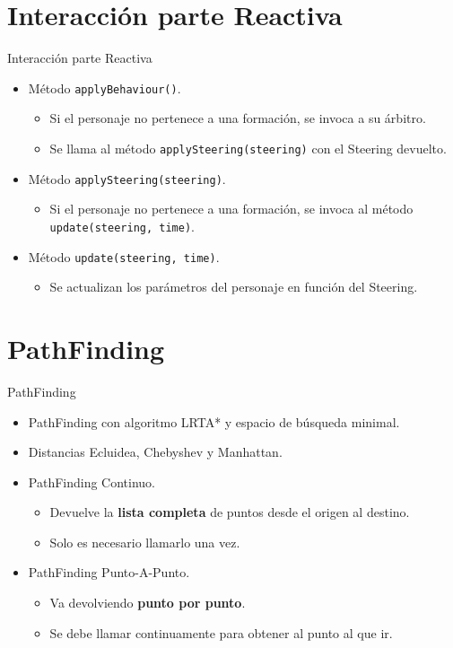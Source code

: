 \documentclass[10pt]{beamer}
\begin{document}
\section{Interacción parte Reactiva}
\begin{frame}{Interacción parte Reactiva}
\begin{itemize}[<+- | alert@+>]
	\item Método \texttt{applyBehaviour()}.
	\begin{itemize}[<+- | alert@+>]
	 \item Si el personaje no pertenece a una formación, se invoca a su árbitro.
	 \item Se llama al método \texttt{applySteering(steering)} con el Steering devuelto.
	\end{itemize}

	\item Método \texttt{applySteering(steering)}.
	\begin{itemize}[<+- | alert@+>]
	 \item Si el personaje no pertenece a una formación, se invoca al método \texttt{update(steering, time)}.
	\end{itemize}

	\item Método \texttt{update(steering, time)}.
	\begin{itemize}[<+- | alert@+>]
	 \item Se actualizan los parámetros del personaje en función del Steering.
	\end{itemize}

\end{itemize}
\end{frame}

\section{PathFinding}
\begin{frame}{PathFinding}
\begin{itemize}[<+- | alert@+>]
 
  \item PathFinding con algoritmo LRTA* y espacio de búsqueda minimal.
  \item Distancias Ecluidea, Chebyshev y Manhattan.
  
  \item PathFinding Continuo.
  \begin{itemize}[<+- | alert@+>]
   \item Devuelve la \textbf{lista completa} de puntos desde el origen al destino.
   \item Solo es necesario llamarlo una vez.
  \end{itemize}

  \item PathFinding Punto-A-Punto.
	\begin{itemize}[<+- | alert@+>]
  		\item Va devolviendo \textbf{punto por punto}.
  		\item Se debe llamar continuamente para obtener al punto al que ir.
 	\end{itemize}
\end{itemize}
\end{frame}
\end{document}
